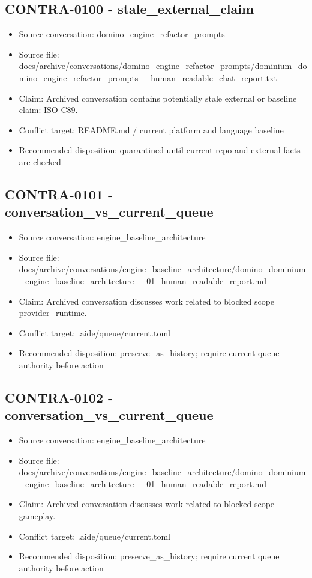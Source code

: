 \documentclass[11pt,a4paper]{report}
\begin{document}
\subsection{CONTRA-0100 - stale\_external\_claim}

\begin{itemize}
\item Source conversation: domino\_engine\_refactor\_prompts
\item Source file: docs/archive/conversations/domino\_engine\_refactor\_prompts/dominium\_domino\_engine\_refactor\_prompts\_\_human\_readable\_chat\_report.txt
\item Claim: Archived conversation contains potentially stale external or baseline claim: ISO C89.
\item Conflict target: README.md / current platform and language baseline
\item Recommended disposition: quarantined until current repo and external facts are checked
\end{itemize}

\subsection{CONTRA-0101 - conversation\_vs\_current\_queue}

\begin{itemize}
\item Source conversation: engine\_baseline\_architecture
\item Source file: docs/archive/conversations/engine\_baseline\_architecture/domino\_dominium\_engine\_baseline\_architecture\_\_01\_human\_readable\_report.md
\item Claim: Archived conversation discusses work related to blocked scope provider\_runtime.
\item Conflict target: .aide/queue/current.toml
\item Recommended disposition: preserve\_as\_history; require current queue authority before action
\end{itemize}

\subsection{CONTRA-0102 - conversation\_vs\_current\_queue}

\begin{itemize}
\item Source conversation: engine\_baseline\_architecture
\item Source file: docs/archive/conversations/engine\_baseline\_architecture/domino\_dominium\_engine\_baseline\_architecture\_\_01\_human\_readable\_report.md
\item Claim: Archived conversation discusses work related to blocked scope gameplay.
\item Conflict target: .aide/queue/current.toml
\item Recommended disposition: preserve\_as\_history; require current queue authority before action
\end{itemize}
\end{document}
